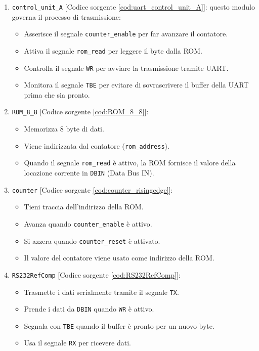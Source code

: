 \begin{enumerate}
    \item \texttt{control\_unit\_A} [Codice sorgente \ref{cod:uart_control_unit_A}]: questo modulo governa il processo di trasmissione:
    \begin{itemize}
        \item Asserisce il segnale \texttt{counter\_enable} per far avanzare il contatore.
        \item Attiva il segnale \texttt{rom\_read} per leggere il byte dalla ROM.
        \item Controlla il segnale \texttt{WR} per avviare la trasmissione tramite UART.
        \item Monitora il segnale \texttt{TBE} per evitare di sovrascrivere il buffer della UART prima che sia pronto.
    \end{itemize}
    \item \texttt{ROM\_8\_8} [Codice sorgente \ref{cod:ROM_8_8}]:
    \begin{itemize}
        \item Memorizza 8 byte di dati.
        \item Viene indirizzata dal contatore (\texttt{rom\_address}).
        \item Quando il segnale \texttt{rom\_read} è attivo, la ROM fornisce il valore della locazione corrente in \texttt{DBIN} (Data Bus IN).
    \end{itemize}
    \item \texttt{counter} [Codice sorgente \ref{cod:counter_risingedge}]:
    \begin{itemize}
        \item Tieni traccia dell'indirizzo della ROM.
        \item Avanza quando \texttt{counter\_enable} è attivo.
        \item Si azzera quando \texttt{counter\_reset} è attivato.
        \item Il valore del contatore viene usato come indirizzo della ROM.
    \end{itemize}
    \item \texttt{RS232RefComp} [Codice sorgente \ref{cod:RS232RefComp}]:
    \begin{itemize}
        \item Trasmette i dati serialmente tramite il segnale \texttt{TX}.
        \item Prende i dati da \texttt{DBIN} quando \texttt{WR} è attivo.
        \item Segnala con \texttt{TBE} quando il buffer è pronto per un nuovo byte.
        \item Usa il segnale \texttt{RX} per ricevere dati.
    \end{itemize}
\end{enumerate}

